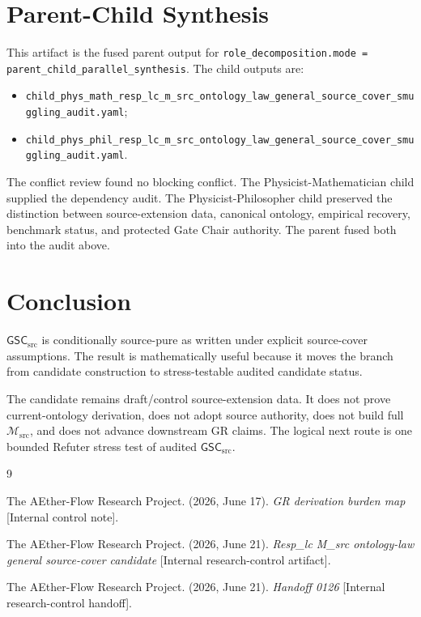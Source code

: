 \documentclass[11pt]{article}
\newcommand{\Msrc}{\mathcal{M}_{\mathrm{src}}}
\newcommand{\GSC}{\mathsf{GSC}_{\mathrm{src}}}
\begin{document}
\section{Parent-Child Synthesis}

This artifact is the fused parent output for
\texttt{role\_decomposition.mode = parent\_child\_parallel\_synthesis}. The
child outputs are:
\begin{itemize}
  \item \texttt{child\_phys\_math\_resp\_lc\_m\_src\_ontology\_law\_general\_source\_cover\_smuggling\_audit.yaml};
  \item \texttt{child\_phys\_phil\_resp\_lc\_m\_src\_ontology\_law\_general\_source\_cover\_smuggling\_audit.yaml}.
\end{itemize}
The conflict review found no blocking conflict. The Physicist-Mathematician
child supplied the dependency audit. The Physicist-Philosopher child preserved
the distinction between source-extension data, canonical ontology, empirical
recovery, benchmark status, and protected Gate Chair authority. The parent
fused both into the audit above.

\section{Conclusion}

\(\GSC\) is conditionally source-pure as written under explicit source-cover
assumptions. The result is mathematically useful because it moves the branch
from candidate construction to stress-testable audited candidate status.

The candidate remains draft/control source-extension data. It does not prove
current-ontology derivation, does not adopt source authority, does not build
full \(\Msrc\), and does not advance downstream GR claims. The logical next
route is one bounded Refuter stress test of audited \(\GSC\).

\begin{thebibliography}{9}

The AEther-Flow Research Project. (2026, June 17). \emph{GR derivation burden
map} [Internal control note].

The AEther-Flow Research Project. (2026, June 21). \emph{Resp\_lc M\_src
ontology-law general source-cover candidate} [Internal research-control
artifact].

The AEther-Flow Research Project. (2026, June 21). \emph{Handoff 0126}
[Internal research-control handoff].

\end{thebibliography}
\end{document}
